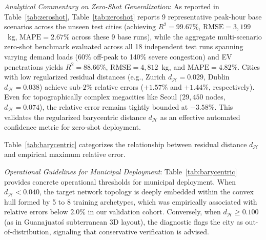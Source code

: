 \documentclass[journal]{IEEEtran}
\begin{document}
\textit{Analytical Commentary on Zero-Shot Generalization}:
As reported in Table~\ref{tab:zeroshot}, Table~\ref{tab:zeroshot} reports 9 representative peak-hour base scenarios across the unseen test cities (achieving $R^2 = 99.67\%$, $\text{RMSE} = 3,199$~kg, $\text{MAPE} = 2.67\%$ across these 9 base runs), while the aggregate multi-scenario zero-shot benchmark evaluated across all 18 independent test runs spanning varying demand loads (60\% off-peak to 140\% severe congestion) and EV penetrations yields $R^2 = 88.66\%$, $\text{RMSE} = 4,812$~kg, and $\text{MAPE} = 4.82\%$. Cities with low regularized residual distances (e.g., Zurich $d_{\mathcal{H}} = 0.029$, Dublin $d_{\mathcal{H}} = 0.038$) achieve sub-$2\%$ relative errors ($+1.57\%$ and $+1.44\%$, respectively). Even for topographically complex megacities like Seoul ($29,450$ nodes, $d_{\mathcal{H}} = 0.074$), the relative error remains tightly bounded at $-3.58\%$. This validates the regularized barycentric distance $d_{\mathcal{H}}$ as an effective automated confidence metric for zero-shot deployment.

Table~\ref{tab:barycentric} categorizes the relationship between residual distance $d_{\mathcal{H}}$ and empirical maximum relative error.

\begin{table}[htbp]
\caption{Regularized Barycentric Reconstruction Residual vs. Prediction Error Range}
\label{tab:barycentric}
\centering
{}
\end{table}

\textit{Operational Guidelines for Municipal Deployment}:
Table~\ref{tab:barycentric} provides concrete operational thresholds for municipal deployment. When $d_{\mathcal{H}} < 0.040$, the target network topology is deeply embedded within the convex hull formed by 5 to 8 training archetypes, which was empirically associated with relative errors below $2.0\%$ in our validation cohort. Conversely, when $d_{\mathcal{H}} \ge 0.100$ (as in Guanajuato\'s subterranean 3D layout), the diagnostic flags the city as out-of-distribution, signaling that conservative verification is advised.
\end{document}
